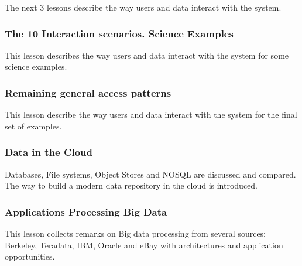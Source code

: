 The next 3 lessons describe the way users and data interact with the
system.


\subsubsection{The 10 Interaction scenarios. Science Examples}

This lesson describes the way users and data interact with the system
for some science examples.


\subsubsection{Remaining general access patterns}

This lesson describe the way users and data interact with the system for
the final set of examples.



\subsubsection{Data in the Cloud}\label{data-in-the-cloud}

Databases, File systems, Object Stores and NOSQL are discussed and
compared. The way to build a modern data repository in the cloud is
introduced.


\subsubsection{Applications Processing Big Data}

This lesson collects remarks on Big data processing from several
sources: Berkeley, Teradata, IBM, Oracle and eBay with architectures and
application opportunities.


